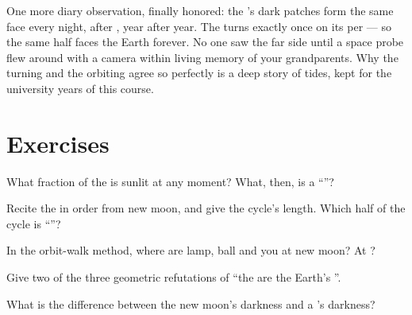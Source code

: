 \begin{remark}\label{rem:g7:moon-phases:sameface}
One more diary observation, finally honored: the 's dark
patches form the same face every night,  after , year
after year. The  turns exactly once on its  per 
--- so the same half faces the Earth forever. No one saw the far
side until a space probe flew around with a camera within
living memory of your grandparents. Why the turning and the
orbiting agree so perfectly is a deep story of tides, kept for
the university years of this course.
\end{remark}

\section{Exercises}

\begin{exercise}[$\star$]\label{exo:g7:moon-phases:1}
What fraction of the  is sunlit at any moment? What, then,
is a ``''?
\end{exercise}

\begin{exercise}[$\star$]\label{exo:g7:moon-phases:2}
Recite the  in order from new moon, and give the cycle's
length. Which half of the cycle is ``''?
\end{exercise}

\begin{exercise}[$\star$]\label{exo:g7:moon-phases:3}
In the orbit-walk method, where are lamp, ball and you at new
moon? At ?
\end{exercise}

\begin{exercise}[$\star$]\label{exo:g7:moon-phases:4}
Give two of the three geometric refutations of ``the  are
the Earth's ''.
\end{exercise}

\begin{exercise}[$\star$]\label{exo:g7:moon-phases:5}
What is the difference between the new moon's darkness and a
's darkness?
\end{exercise}


